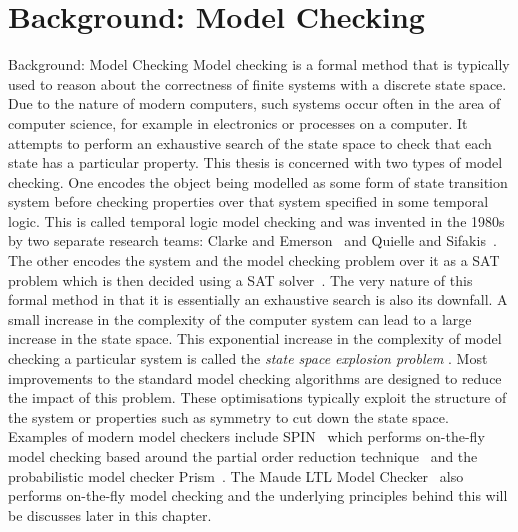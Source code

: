 \chapter{Background: Model Checking}{Background: Model Checking}\label{chapter:modelchecking}
Model checking is a formal method that is typically used to reason about the correctness of finite systems with a discrete state space. Due to the nature of modern computers, such systems occur often in the area of computer science, for example in electronics or processes on a computer. It attempts to perform an exhaustive search of the state space to check that each state has a particular property. This thesis is concerned with two types of model checking. One encodes the object being modelled as some form of state transition system before checking properties over that system specified in some temporal logic. This is called temporal logic model checking and was invented in the 1980s by two separate research teams:  Clarke and Emerson~\cite{EM82} and Quielle and Sifakis~\cite{JQ82}. The other encodes the system and the model checking problem over it as a SAT problem which is then decided using a SAT solver~\cite{MS00}. The very nature of this formal method in that it is essentially an exhaustive search is also its downfall. A small increase in the complexity of the computer system can lead to a large increase in the state space. This exponential increase in the complexity of model checking a particular system is called the  \emph{state space explosion problem} \cite{EC01b,RP09}. Most improvements to the standard model checking algorithms are designed to reduce the impact of this problem. These optimisations typically exploit the structure of the system or properties such as symmetry to cut down the state space. Examples of modern model checkers include SPIN~\cite{GH04} which performs on-the-fly model checking  based around the partial order reduction technique~\cite{DP94}  and the probabilistic model checker Prism~\cite{MK11}. The Maude LTL Model Checker~\cite{ES00} also performs on-the-fly model checking and the underlying principles behind this will be discusses later in this chapter.

